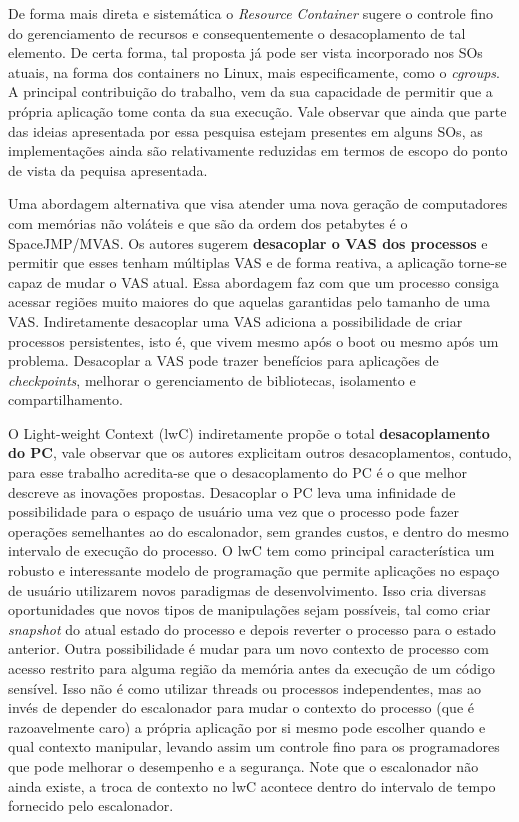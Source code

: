De forma mais direta e sistemática o \textit{Resource Container} sugere o
controle fino do gerenciamento de recursos e consequentemente o desacoplamento
de tal elemento. De certa forma, tal proposta já pode ser vista incorporado nos
SOs atuais, na forma dos containers no Linux, mais especificamente, como o
\textit{cgroups}. A principal contribuição do trabalho, vem da sua capacidade
de permitir que a própria aplicação tome conta da sua execução.  Vale observar
que ainda que parte das ideias apresentada por essa pesquisa estejam presentes
em alguns SOs, as implementações ainda são relativamente reduzidas em termos de
escopo do ponto de vista da pequisa apresentada.

Uma abordagem alternativa que visa atender uma nova geração de computadores com
memórias não voláteis e que são da ordem dos petabytes é o SpaceJMP/MVAS.  Os
autores sugerem \textbf{desacoplar o VAS dos processos} e permitir que esses
tenham múltiplas VAS e de forma reativa, a aplicação torne-se capaz de mudar o
VAS atual. Essa abordagem faz com que um processo consiga acessar regiões muito
maiores do que aquelas garantidas pelo tamanho de uma VAS. Indiretamente
desacoplar uma VAS adiciona a possibilidade de criar processos persistentes,
isto é, que vivem mesmo após o boot ou mesmo após um problema. Desacoplar a VAS
pode trazer benefícios para aplicações de \textit{checkpoints}, melhorar o
gerenciamento de bibliotecas, isolamento e compartilhamento.

O Light-weight Context (lwC) indiretamente propõe o total
\textbf{desacoplamento do PC}, vale observar que os autores explicitam outros
desacoplamentos, contudo, para esse trabalho acredita-se que o desacoplamento
do PC é o que melhor descreve as inovações propostas. Desacoplar o PC leva uma
infinidade de possibilidade para o espaço de usuário uma vez que o processo
pode fazer operações semelhantes ao do escalonador, sem grandes custos, e
dentro do mesmo intervalo de execução do processo. O lwC tem como principal
característica um robusto e interessante modelo de programação que permite
aplicações no espaço de usuário utilizarem novos paradigmas de desenvolvimento.
Isso cria diversas oportunidades que novos tipos de manipulações sejam
possíveis, tal como criar \emph{snapshot} do atual estado do processo e depois
reverter o processo para o estado anterior. Outra possibilidade é mudar para um
novo contexto de processo com acesso restrito para alguma região da memória
antes da execução de um código sensível. Isso não é como utilizar threads ou
processos independentes, mas ao invés de depender do escalonador para mudar o
contexto do processo (que é razoavelmente caro) a própria aplicação por si
mesmo pode escolher quando e qual contexto manipular, levando assim um controle
fino para os programadores que pode melhorar o desempenho e a segurança. Note
que o escalonador não ainda existe, a troca de contexto no lwC acontece dentro
do intervalo de tempo fornecido pelo escalonador.

